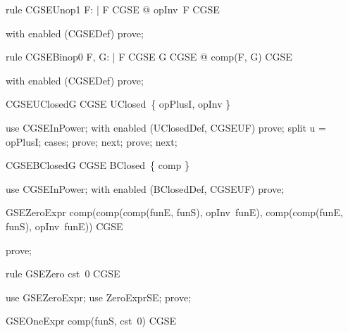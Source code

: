 \documentclass{article}
\begin{document}
\begin{theorem}{rule CGSEUnop1}
  \forall F: \nat \fun \nat | F \in CGSE @ opInv~F \in CGSE
\end{theorem}

\begin{zproof}
with enabled (CGSEDef) prove;
\end{zproof}

\begin{theorem}{rule CGSEBinop0}
  \forall F, G: \nat \fun \nat | F \in CGSE \land G \in CGSE @ comp(F, G) \in CGSE
\end{theorem}

\begin{zproof}
with enabled (CGSEDef) prove;
\end{zproof}

\begin{theorem}{CGSEUClosedG}
  CGSE \in UClosed~\{ opPlusI, opInv \}
\end{theorem}

\begin{zproof}
use CGSEInPower;
with enabled (UClosedDef, CGSEUF) prove;
split u = opPlusI;
cases;
prove;
next;
prove;
next;
\end{zproof}

\begin{theorem}{CGSEBClosedG}
  CGSE \in BClosed~\{ comp \}
\end{theorem}

\begin{zproof}
use CGSEInPower;
with enabled (BClosedDef, CGSEUF) prove;
\end{zproof}

\begin{theorem}{GSEZeroExpr}
  comp(comp(comp(funE, funS), opInv~funE), comp(comp(funE, funS), opInv~funE)) \in CGSE
\end{theorem}

\begin{zproof}
prove;
\end{zproof}

\begin{theorem}{rule GSEZero}
  cst~0 \in CGSE
\end{theorem}

\begin{zproof}
use GSEZeroExpr;
use ZeroExprSE;
prove;
\end{zproof}

\begin{theorem}{GSEOneExpr}
  comp(funS, cst~0) \in CGSE
\end{theorem}
\end{document}
